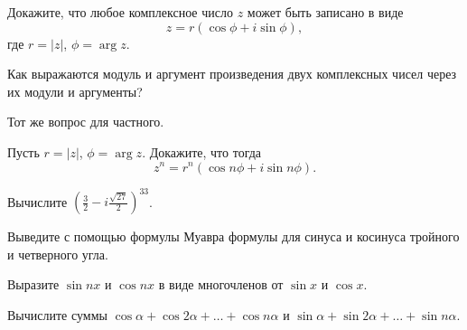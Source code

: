 \documentclass[a4paper, 12pt, num=21]{listok}
\begin{document}
\begin{problem}
	Докажите, что любое комплексное число $z$ может быть записано в виде
	\[
		z = r(\cos \phi + i \sin \phi),
	\]
	где $r = |z|$, $\phi = \arg z$.
\end{problem}
\begin{problem}
\begin{probparts}
	\item Как выражаются модуль и аргумент произведения двух комплексных чисел через их модули и аргументы?
	\item Тот же вопрос для частного.
\end{probparts}
\end{problem}
\begin{problem}
	Пусть $r = |z|$, $\phi = \arg z$.
	Докажите, что тогда
	\[
		z^n = r^n (\cos{n\phi} + i \sin{n\phi}).
	\]
\end{problem}
\begin{problem}
	Вычислите ${\left ( \frac 3 2 - i \frac{\sqrt{27}}2 \right )}^{33}$.
\end{problem}
\begin{problem}
\begin{probparts}
	\item Выведите с помощью формулы Муавра формулы для синуса и косинуса тройного и четверного угла.
	\item Выразите $\sin{nx}$ и $\cos{nx}$ в виде многочленов от $\sin x$ и $\cos x$.
\end{probparts}
\end{problem}
\begin{problem}
	Вычислите суммы $\cos \alpha + \cos{2\alpha} + \ldots + \cos{n\alpha}$ и $\sin \alpha + \sin{2\alpha} + \ldots + \sin{n\alpha}$.
\end{problem}
\end{document}
